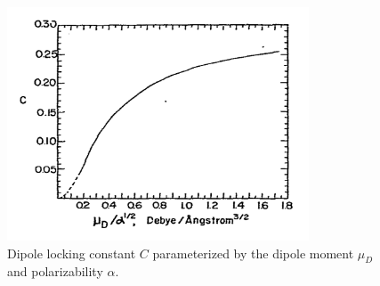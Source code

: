 \begin{figure}[H]
	\label{fig: C}
	\centering
	\includegraphics[width=0.8\textwidth]{images/ADO_C.pdf}
	\caption{Dipole locking constant $C$ parameterized by the dipole moment $\mu_D$ and polarizability $\alpha$.\cite{Su1973}}
\end{figure}
